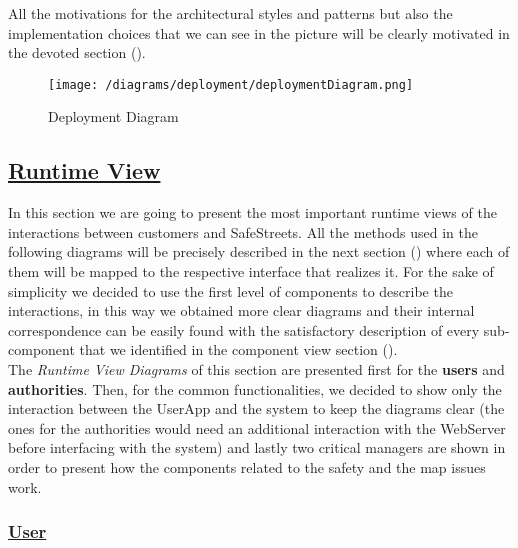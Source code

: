 			All the motivations for the architectural styles and patterns but also the implementation choices that we can see in the picture will be clearly motivated in the devoted section (). 
						
			\begin{figure}[hbtp]
				\centering
				\texttt{[image: /diagrams/deployment/deploymentDiagram.png]}
				\caption{\label{fig:deploymentDiagram} Deployment Diagram}
			\end{figure}
		
			\FloatBarrier
			
	\subsection[Runtime View]{\hyperlink{toc}{Runtime View}}
		\label{sec:runtimeView}
		
		In this section we are going to present the most important runtime views of the interactions between customers and SafeStreets. All the methods used in the following diagrams will be precisely described in the next section () where each of them will be mapped to the respective interface that realizes it. For the sake of simplicity we decided to use the first level of components to describe the interactions, in this way we obtained more clear diagrams and their internal correspondence can be easily found with the satisfactory description of every sub-component that we identified in the component view section (). \\
		
		The \emph{Runtime View Diagrams} of this section are presented first for the \textbf{users} and \textbf{authorities}. Then, for the common functionalities, we decided to show only the interaction between the UserApp and the system to keep the diagrams clear (the ones for the authorities would need an additional interaction with the WebServer before interfacing with the system) and lastly two critical managers are shown in order to present how the components related to the safety and the map issues work.
		
		\subsubsection[User]{\hyperlink{toc}{User}}
			\label{sec:userRuntimeView}
			

